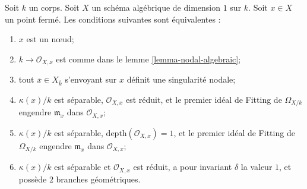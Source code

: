 \begin{lemma}
\label{lemma-nodal}
Soit $k$ un corps. Soit $X$ un schéma algébrique de dimension $1$ sur $k$. Soit $x \in X$ un point fermé. Les conditions suivantes sont équivalentes : \begin{enumerate} \item $x$ est un nœud; \item $k \to \mathcal{O}_{X, x}$ est comme dans le lemme \ref{lemma-nodal-algebraic}; \item tout $\overline{x} \in X_{\overline{k}}$ s'envoyant sur $x$ définit une singularité nodale; \item $\kappa(x)/k$ est séparable, $\mathcal{O}_{X, x}$ est réduit, et le premier idéal de Fitting de $\Omega_{X/k}$ engendre $\mathfrak m_x$ dans $\mathcal{O}_{X, x}$; \item $\kappa(x)/k$ est séparable, $\text{depth}(\mathcal{O}_{X, x}) = 1$, et le premier idéal de Fitting de $\Omega_{X/k}$ engendre $\mathfrak m_x$ dans $\mathcal{O}_{X, x}$; \item $\kappa(x)/k$ est séparable et $\mathcal{O}_{X, x}$ est réduit, a pour invariant $\delta$ la valeur $1$, et possède $2$ branches géométriques.
\end{enumerate}
\end{lemma}

